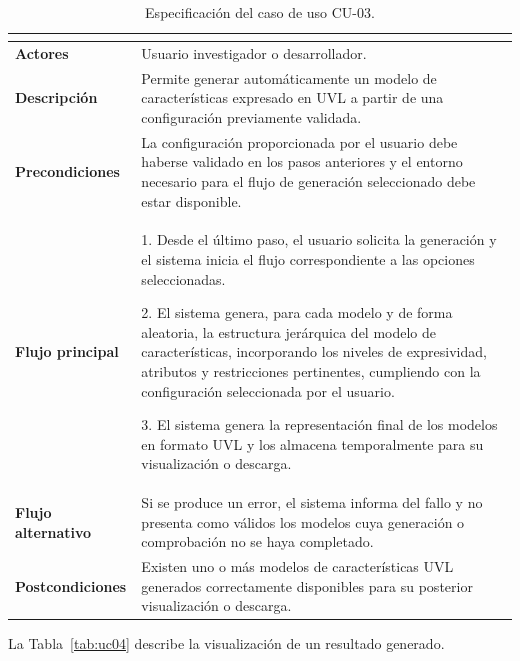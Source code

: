 \begin{table}[H]
\centering
\small
\renewcommand{\arraystretch}{1.35}
\begin{tabular}{@{}>{\bfseries\RaggedRight\arraybackslash}p{4cm} P{10cm}@{}}
\toprule
{} \\
\midrule

Actores &
Usuario investigador o desarrollador. \\

Descripción &
Permite generar automáticamente un modelo de características expresado en UVL a partir de una configuración previamente validada. \\

Precondiciones &
La configuración proporcionada por el usuario debe haberse validado
en los pasos anteriores y el entorno necesario para el flujo de
generación seleccionado debe estar disponible. \\

Flujo principal &
1. Desde el último paso, el usuario solicita la generación y el
sistema inicia el flujo correspondiente a las opciones seleccionadas.

2. El sistema genera, para cada modelo y de forma aleatoria, la estructura jerárquica del modelo de características, incorporando los niveles de expresividad, atributos y restricciones pertinentes, cumpliendo con la configuración seleccionada por el usuario.

3. El sistema genera la representación final de los modelos en formato UVL y los almacena temporalmente para su visualización o descarga. \\

Flujo alternativo &
Si se produce un error, el sistema informa del fallo y no presenta
como válidos los modelos cuya generación o comprobación no se haya
completado. \\

Postcondiciones &
Existen uno o más modelos de características UVL generados correctamente disponibles para su posterior visualización o descarga. \\

\bottomrule
\end{tabular}
\caption{Especificación del caso de uso CU-03.}
\label{tab:uc03}
\end{table}

La Tabla~\ref{tab:uc04} describe la visualización de un resultado generado.

